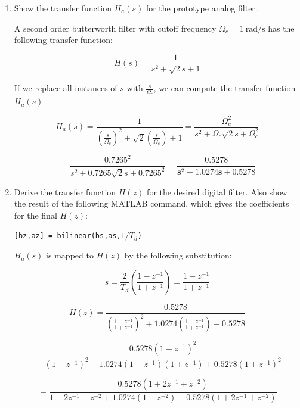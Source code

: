 \documentclass[fleqn]{article}
\begin{document}
\begin{enumerate}[nolistsep]
\begin{enumerate}
			\item Show the transfer function $H_a(s)$ for the prototype analog filter.
			
			A second order butterworth filter with cutoff frequency $\Omega_c = 1\ \text{rad/s}$ has the following transfer function:
			
			\begin{equation*}
				H(s) = \frac{1}{s^2 + \sqrt{2}s + 1}
			\end{equation*}
			
			\pagebreak
			If we replace all instances of $s$ with $\frac{s}{\Omega_c}$, we can compute the transfer function $H_a(s)$
			
			\begin{equation*}
				H_a(s) = \frac{1}{\left(\frac{s}{\Omega_c}\right)^2 + \sqrt{2}\left(\frac{s}{\Omega_c}\right) + 1} = \frac{\Omega_c^2}{s^2 + \Omega_c\sqrt{2}s + \Omega_c^2}
			\end{equation*}
			
			\begin{equation*}
				= \frac{0.7265^2}{s^2 + 0.7265\sqrt{2}s + 0.7265^2} = \mathbf{\frac{0.5278}{s^2 + 1.0274s + 0.5278}}
			\end{equation*}
			
			\item Derive the transfer function $H(z)$ for the desired digital filter. Also show the result of the following MATLAB command, which gives the coefficients for the final $H(z)$:
			
			\texttt{[bz,az] = bilinear(bs,as,$1/T_d$)}
			
			$H_a(s)$ is mapped to $H(z)$ by the following substitution:
			
			\begin{equation*}
				s = \frac{2}{T_d}\left(\frac{1 - z^{-1}}{1 + z^{-1}}\right) = \frac{1 - z^{-1}}{1 + z^{-1}}
			\end{equation*}
			
			\begin{equation*}
				H(z) = \frac{0.5278}{\left(\frac{1 - z^{-1}}{1 + z^{-1}}\right)^2 + 1.0274\left(\frac{1 - z^{-1}}{1 + z^{-1}}\right) + 0.5278}
			\end{equation*}
			
			\begin{equation*}
				= \frac{0.5278(1 + z^{-1})^2}{(1 - z^{-1})^2 + 1.0274(1 - z^{-1})(1 + z^{-1}) + 0.5278(1 + z^{-1})^2}
			\end{equation*}
			
			\begin{equation*}
				= \frac{0.5278(1 + 2z^{-1} + z^{-2})}{1 - 2z^{-1} + z^{-2} + 1.0274(1 - z^{-2}) + 0.5278(1 + 2z^{-1} + z^{-2})}
			\end{equation*}
			

\end{enumerate}
\end{enumerate}
\end{document}
